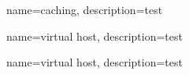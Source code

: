 {
	name={caching},
	description={test}
}

{
	name={virtual host},
	description={test}
}

{
	name={virtual host},
	description={test}
}

